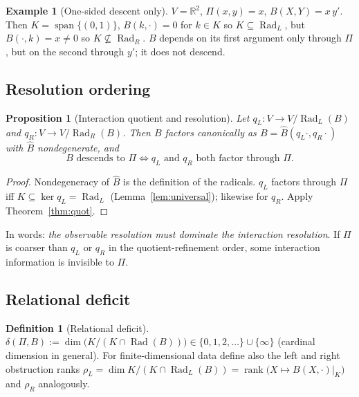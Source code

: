 \documentclass[11pt,a4paper]{article}
\newcommand{\RR}{\mathbb{R}}
\newcommand{\Rad}{\operatorname{Rad}}
\newcommand{\rk}{\operatorname{rank}}
\newcommand{\spn}{\operatorname{span}}
\newcommand{\defic}{\delta}
\theoremstyle{plain}
\newtheorem{proposition}[theorem]{Proposition}
\theoremstyle{definition}
\newtheorem{definition}[theorem]{Definition}
\newtheorem{example}[theorem]{Example}
\begin{document}
\begin{example}[One-sided descent only]\label{ex:onesided}
$V=\RR^2$, $\Pi(x,y)=x$, $B(X,Y)=x\,y'$. Then $K=\spn\{(0,1)\}$, $B(k,\cdot)=0$ for $k\in K$ so $K\subseteq\Rad_L$, but $B(\cdot,k)=x\neq0$ so $K\not\subseteq\Rad_R$. $B$ depends on its first argument only through $\Pi$, but on the second through $y'$; it does not descend.
\end{example}

\subsection{Resolution ordering}
\begin{proposition}[Interaction quotient and resolution]\label{prop:resolution}
Let $q_L\colon V\to V/\Rad_L(B)$ and $q_R\colon V\to V/\Rad_R(B)$. Then $B$ factors canonically as $B=\hat B(q_L\cdot,q_R\cdot)$ with $\hat B$ nondegenerate, and
\[ B\text{ descends to }\Pi\iff q_L\text{ and }q_R\text{ both factor through }\Pi. \]
\end{proposition}
\begin{proof}
Nondegeneracy of $\hat B$ is the definition of the radicals. $q_L$ factors through $\Pi$ iff $K\subseteq\ker q_L=\Rad_L$ (Lemma~\ref{lem:universal}); likewise for $q_R$. Apply Theorem~\ref{thm:quot}.
\end{proof}
In words: \emph{the observable resolution must dominate the interaction resolution}. If $\Pi$ is coarser than $q_L$ or $q_R$ in the quotient-refinement order, some interaction information is invisible to $\Pi$.

\subsection{Relational deficit}
\begin{definition}[Relational deficit]\label{def:deficit}
$\defic(\Pi,B):=\dim\bigl(K/(K\cap\Rad(B))\bigr)\in\{0,1,2,\dots\}\cup\{\infty\}$ (cardinal dimension in general).
For finite-dimensional data define also the left and right obstruction ranks
$\rho_L=\dim K/(K\cap\Rad_L(B))=\rk\bigl(X\mapsto B(X,\cdot)\big|_K\bigr)$ and $\rho_R$ analogously.
\end{definition}
\end{document}
